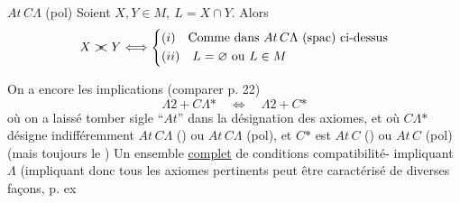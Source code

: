 \uline{$At\,C\Lambda$} (pol) Soient $X,Y\in M,\ L=X\cap Y$. Alors
\[
X\mathrel{\rlap{$>$}<} Y\Longleftrightarrow\left\{\begin{aligned}
&(i)\quad\text{Comme dans }At\,C\Lambda\ \text{(spac) ci-dessus}\\
&(ii)\quad L=\varnothing\ \text{ou } L\in M
\end{aligned}\right.
\]

On a encore les implications (comparer p. 22)
\[
\Lambda2+C\Lambda\mathord{*}\quad\Longleftrightarrow\quad\Lambda2+C\mathord{*}
\]
où on a laissé tomber  sigle ``$At$'' dans la désignation des axiomes, et où $C\Lambda\mathord{*}$ désigne indifféremment $At\,C\Lambda$ () ou $At\,C\Lambda$ (pol), et  $C\mathord{*}$ est $At\,C$ () ou $At\,C$ (pol) (mais toujours le )
Un ensemble \uline{complet} de conditions  compatibilité- impliquant $\Lambda$  (impliquant donc tous les axiomes pertinents
peut être caractérisé de diverses façons, p. ex

